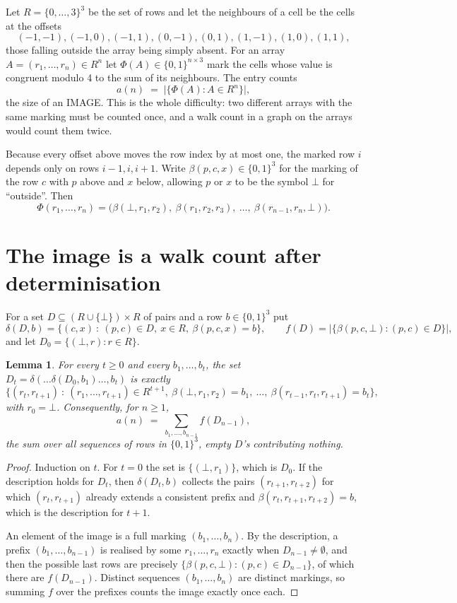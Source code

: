 \documentclass[11pt,a4paper]{article}
\theoremstyle{plain}
\newtheorem{lemma}[theorem]{Lemma}
\theoremstyle{definition}
\begin{document}
Let $R=\{0,\dots,3\}^{3}$ be the set of rows and let the neighbours of a cell be the
cells at the offsets
\[
(-1,-1), (-1,0), (-1,1), (0,-1), (0,1), (1,-1), (1,0), (1,1),
\]
those falling outside the array being simply absent. For an array
$A=(r_1,\dots,r_n)\in R^n$ let $\Phi(A)\in\{0,1\}^{n\times3}$ mark the cells whose value
is congruent modulo 4 to the sum of its neighbours. The entry counts
\[
a(n)\;=\;\bigl|\{\Phi(A):A\in R^n\}\bigr| ,
\]
the size of an IMAGE. This is the whole difficulty: two different arrays with the same marking
must be counted once, and a walk count in a graph on the arrays would count them twice.

Because every offset above moves the row index by at most one, the marked row $i$ depends only
on rows $i-1,i,i+1$. Write $\beta(p,c,x)\in\{0,1\}^{3}$ for the marking of the row $c$
with $p$ above and $x$ below, allowing $p$ or $x$ to be the symbol $\bot$ for ``outside''.
Then
\[
\Phi(r_1,\dots,r_n)=\bigl(\beta(\bot,r_1,r_2),\ \beta(r_1,r_2,r_3),\ \dots,\
\beta(r_{n-1},r_n,\bot)\bigr).
\]

\section{The image is a walk count after determinisation}

For a set $D\subseteq(R\cup\{\bot\})\times R$ of pairs and a row $b\in\{0,1\}^{3}$ put
\[
\delta(D,b)=\{(c,x)\ :\ (p,c)\in D,\ x\in R,\ \beta(p,c,x)=b\},\qquad
f(D)=\bigl|\{\beta(p,c,\bot):(p,c)\in D\}\bigr| ,
\]
and let $D_0=\{(\bot,r):r\in R\}$.

\begin{lemma}\label{lem:det}
For every $t\ge0$ and every $b_1,\dots,b_t$, the set
$D_t=\delta(\dots\delta(D_0,b_1)\dots,b_t)$ is exactly
\[
\{(r_t,r_{t+1})\ :\ (r_1,\dots,r_{t+1})\in R^{t+1},\ \beta(\bot,r_1,r_2)=b_1,\ \dots,\
\beta(r_{t-1},r_t,r_{t+1})=b_t\} ,
\]
with $r_0=\bot$. Consequently, for $n\ge1$,
\[
a(n)\;=\;\sum_{b_1,\dots,b_{n-1}}f(D_{n-1}),
\]
the sum over all sequences of rows in $\{0,1\}^{3}$, empty $D$'s contributing nothing.
\end{lemma}

\begin{proof}
Induction on $t$. For $t=0$ the set is $\{(\bot,r_1)\}$, which is $D_0$. If the description
holds for $D_t$, then $\delta(D_t,b)$ collects the pairs $(r_{t+1},r_{t+2})$ for which
$(r_t,r_{t+1})$ already extends a consistent prefix and
$\beta(r_t,r_{t+1},r_{t+2})=b$, which is the description for $t+1$.

An element of the image is a full marking $(b_1,\dots,b_n)$. By the description, a prefix
$(b_1,\dots,b_{n-1})$ is realised by some $r_1,\dots,r_n$ exactly when $D_{n-1}\neq
\emptyset$, and then the possible last rows are precisely
$\{\beta(p,c,\bot):(p,c)\in D_{n-1}\}$, of which there are $f(D_{n-1})$. Distinct
sequences $(b_1,\dots,b_n)$ are distinct markings, so summing $f$ over the prefixes counts the
image exactly once each.
\end{proof}
\end{document}

